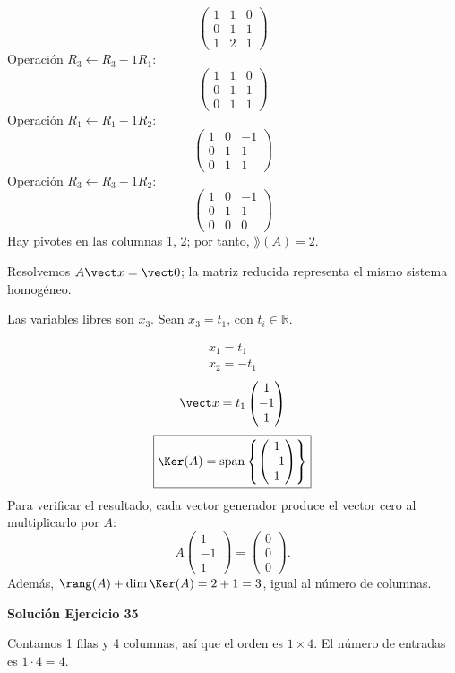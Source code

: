 \[
\begin{pmatrix}1&1&0\\0&1&1\\1&2&1\end{pmatrix}
\]
Operación $R_{3}\leftarrow R_{3}-1R_{1}$:
\[
\begin{pmatrix}1&1&0\\0&1&1\\0&1&1\end{pmatrix}
\]
Operación $R_{1}\leftarrow R_{1}-1R_{2}$:
\[
\begin{pmatrix}1&0&-1\\0&1&1\\0&1&1\end{pmatrix}
\]
Operación $R_{3}\leftarrow R_{3}-1R_{2}$:
\[
\begin{pmatrix}1&0&-1\\0&1&1\\0&0&0\end{pmatrix}
\]
Hay pivotes en las columnas 1, 2; por tanto, $\boxed{\rang(A)=2}$.

Resolvemos $A\vect x=\vect0$; la matriz reducida representa el mismo sistema homogéneo.

Las variables libres son $x_{3}$. Sean $x_{3}=t_{1}$, con $t_i\in\mathbb R$.

\[
\begin{aligned}x_{1}=t_{1}\\x_{2}=- t_{1}\end{aligned}
\]
\[
\vect x=t_{1}\begin{pmatrix}1\\-1\\1\end{pmatrix}
\]
\[
\boxed{\Ker(A)=\operatorname{span}\left\{\begin{pmatrix}1\\-1\\1\end{pmatrix}\right\}}
\]
Para verificar el resultado, cada vector generador produce el vector cero al multiplicarlo por $A$:
\[
A\begin{pmatrix}1\\-1\\1\end{pmatrix}=\begin{pmatrix}0\\0\\0\end{pmatrix}.
\]
Además, $\rang(A)+\dim\Ker(A)=2+1=3$, igual al número de columnas.


\par\bigskip\noindent\textbf{Solución Ejercicio 35}\par\nobreak
Contamos 1 filas y 4 columnas, así que el orden es $1\times4$. El número de entradas es $1\cdot 4=4$.

